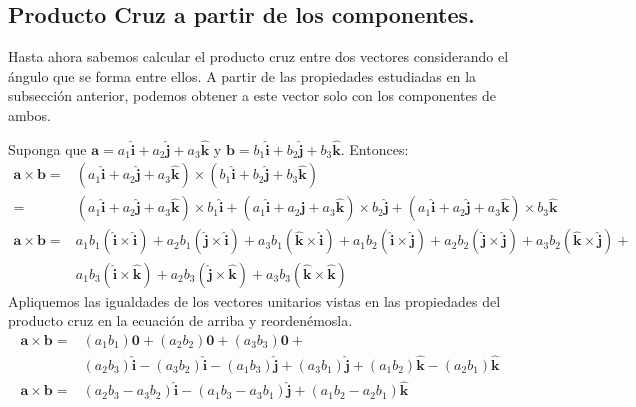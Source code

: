 \documentclass[12pt]{article}
\begin{document}
\subsection{Producto Cruz a partir de los componentes.}

Hasta ahora sabemos calcular el producto cruz entre dos vectores considerando el ángulo que se forma entre ellos. A partir de las propiedades estudiadas en la subsección anterior, podemos obtener a este vector solo con los componentes de ambos.

Suponga que $\mathbf{a} = a_{1} \hat{\mathbf{i}} + a_{2} \hat{\mathbf{j}} + a_{3} \hat{\mathbf{k}}$ y $\mathbf{b} = b_{1} \hat{\mathbf{i}} + b_{2} \hat{\mathbf{j}} + b_{3} \hat{\mathbf{k}}$. Entonces:
\begin{align*}
\mathbf{a} \times \mathbf{b} = &(a_{1} \hat{\mathbf{i}} + a_{2} \hat{\mathbf{j}} + a_{3} \hat{\mathbf{k}}) \times
                                (b_{1} \hat{\mathbf{i}} + b_{2} \hat{\mathbf{j}} + b_{3} \hat{\mathbf{k}}) \\
                             = &(a_{1} \hat{\mathbf{i}} + a_{2} \hat{\mathbf{j}} + a_{3} \hat{\mathbf{k}}) \times b_{1} \hat{\mathbf{i}} + 
                                (a_{1} \hat{\mathbf{i}} + a_{2} \hat{\mathbf{j}} + a_{3} \hat{\mathbf{k}}) \times b_{2} \hat{\mathbf{j}} + 
                               (a_{1} \hat{\mathbf{i}} + a_{2} \hat{\mathbf{j}} + a_{3} \hat{\mathbf{k}}) \times b_{3} \hat{\mathbf{k}} \\
\mathbf{a} \times \mathbf{b} = &a_{1}b_{1}(\hat{\mathbf{i}} \times \hat{\mathbf{i}}) + a_{2}b_{1}(\hat{\mathbf{j}} \times \hat{\mathbf{i}}) +
                               a_{3}b_{1}(\hat{\mathbf{k}} \times \hat{\mathbf{i}}) + a_{1}b_{2}(\hat{\mathbf{i}} \times \hat{\mathbf{j}}) +
                               a_{2}b_{2}(\hat{\mathbf{j}} \times \hat{\mathbf{j}}) + a_{3}b_{2}(\hat{\mathbf{k}} \times \hat{\mathbf{j}}) + \\
                               &a_{1}b_{3}(\hat{\mathbf{i}} \times \hat{\mathbf{k}}) + a_{2}b_{3}(\hat{\mathbf{j}} \times \hat{\mathbf{k}}) +
                                a_{3}b_{3}(\hat{\mathbf{k}} \times \hat{\mathbf{k}})
\end{align*}
Apliquemos las igualdades de los vectores unitarios vistas en las propiedades del producto cruz en la ecuación de arriba y reordenémosla.
\begin{align*}
\mathbf{a} \times \mathbf{b} = &(a_{1}b_{1}) \mathbf{0} + (a_{2}b_{2}) \mathbf{0} + (a_{3}b_{3}) \mathbf{0} + \\
                               &(a_{2}b_{3})\hat{\mathbf{i}} - (a_{3}b_{2}) \hat{\mathbf{i}} - (a_{1}b_{3}) \hat{\mathbf{j}} +
                                (a_{3}b_{1}) \hat{\mathbf{j}} + (a_{1}b_{2}) \hat{\mathbf{k}} - (a_{2}b_{1}) \hat{\mathbf{k}} \\
\mathbf{a} \times \mathbf{b} = &(a_{2}b_{3} - a_{3}b_{2}) \hat{\mathbf{i}} - (a_{1}b_{3} - a_{3}b_{1}) \hat{\mathbf{j}} +
                                (a_{1}b_{2} - a_{2}b_{1}) \hat{\mathbf{k}}
\end{align*}
\end{document}
